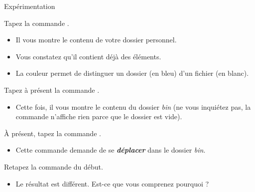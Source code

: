 \documentclass[a4paper,11pt]{style-esi/td}
\begin{document}
		\begin{Tutoriel}{Expérimentation}  
			\vspace{-1em}
			\begin{steps}
			\item Tapez la commande .
				\begin{itemize}
				\item Il vous montre le contenu de votre dossier personnel.
				\item Vous constatez qu'il contient déjà des éléments.
				\item La couleur permet de distinguer un dossier (en bleu) d'un fichier (en blanc).
				\end{itemize}
			\item Tapez à présent la commande .
				\begin{itemize}
				\item Cette fois, il vous montre le contenu du dossier \textit{bin} 
					(ne vous inquiétez pas, la commande n'affiche rien parce que le dossier est vide).
				\end{itemize}
			\item À présent, tapez la commande .
				\begin{itemize}
				\item Cette commande demande de se \textit{\textbf{déplacer}} 
					dans le dossier \textit{bin}.
				\end{itemize}
			\item Retapez la commande  du début.
				\begin{itemize}
				\item Le résultat est différent. 
					Est-ce que vous comprenez pourquoi ?
				\end{itemize}
			\end{steps}
		\end{Tutoriel}
		
\end{document}
